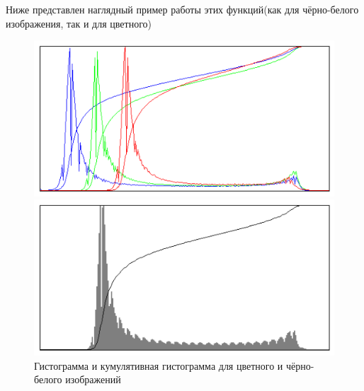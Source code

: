 \documentclass[a4paper,12pt]{article}
\begin{document}
Ниже представлен наглядный пример работы этих функций(как для чёрно-белого изображения, так и для цветного)
\begin{figure}[H]
    \begin{minipage}{0.5\textwidth}
        \centering \includegraphics[width=\textwidth]{images/col_hist.png}
    \end{minipage}\hfill
    \begin{minipage}{0.5\textwidth}
        \centering \includegraphics[width=\textwidth]{images/bw_hist.png}
    \end{minipage}
    \caption{Гистограмма и кумулятивная гистограмма для цветного и чёрно-белого изображений}
\end{figure}
\end{document}
